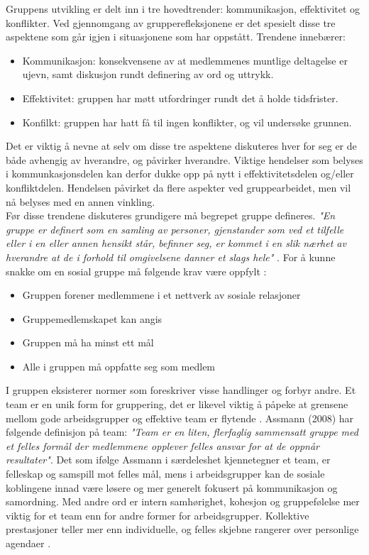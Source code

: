 Gruppens utvikling er delt inn i tre hovedtrender: kommunikasjon, effektivitet og konflikter.
Ved gjennomgang av grupperefleksjonene er det spesielt disse tre aspektene som går igjen i situasjonene som har oppstått.
Trendene innebærer:

\begin{itemize}
\item Kommunikasjon: konsekvensene av at medlemmenes muntlige deltagelse er ujevn, samt diskusjon rundt definering av ord og uttrykk.
\item Effektivitet: gruppen har møtt utfordringer rundt det å holde tidsfrister.
\item Konfilkt: gruppen har hatt få til ingen konflikter, og vil undersøke grunnen.
\end{itemize}

Det er viktig å nevne at selv om disse tre aspektene diskuteres hver for seg er de både avhengig av hverandre, og påvirker hverandre.
Viktige hendelser som belyses i kommunkasjonsdelen kan derfor dukke opp på nytt i effektivitetsdelen og/eller konfliktdelen.
Hendelsen påvirket da flere aspekter ved gruppearbeidet, men vil nå belyses med en annen vinkling.\\

Før disse trendene diskuteres grundigere må begrepet gruppe defineres. 
\emph{"En gruppe er definert som en samling av personer, gjenstander som ved et tilfelle eller i en eller annen hensikt står, befinner seg, er kommet i en slik nærhet av hverandre at de i forhold til omgivelsene danner et slags hele"} \cite{prosjekteringsledelse}.
For å kunne snakke om en sosial gruppe må følgende krav være oppfylt \cite{orgorg}:
\begin{itemize}
\item Gruppen forener medlemmene i et nettverk av sosiale relasjoner
\item Gruppemedlemskapet kan angis
\item Gruppen må ha minst ett mål
\item Alle i gruppen må oppfatte seg som medlem
\end{itemize}

I gruppen eksisterer normer som foreskriver visse handlinger og forbyr andre.
Et team er en unik form for gruppering, det er likevel viktig å påpeke at grensene mellom gode arbeidsgrupper og effektive team er flytende \cite{orgorg}.
Assmann (2008) har følgende definisjon på team: \emph{"Team er en liten, flerfaglig sammensatt gruppe med et felles formål der medlemmene opplever felles ansvar for at de oppnår resultater"}.
Det som ifølge Assmann i særdeleshet kjennetegner et team, er felleskap og samspill mot felles mål, mens i arbeidsgrupper kan de sosiale koblingene innad være løsere og mer generelt fokusert på kommunikasjon og samordning.
Med andre ord er intern samhørighet, kohesjon og gruppefølelse mer viktig for et team enn for andre former for arbeidsgrupper.
Kollektive prestasjoner teller mer enn individuelle, og felles skjebne rangerer over personlige agendaer \cite{orgorg}.